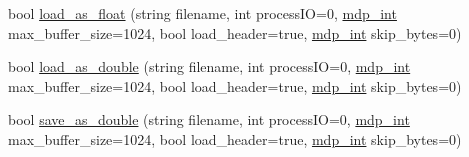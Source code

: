 \begin{DoxyCompactItemize}
\item 
bool \hyperlink{classmdp__complex__field_a41ca79e9686143c660588426dc71dd0b}{load\+\_\+as\+\_\+float} (string filename, int process\+IO=0, \hyperlink{mdp__global__vars_8h_aaa1ad9d0dcd2124aa5af0120d9954174}{mdp\+\_\+int} max\+\_\+buffer\+\_\+size=1024, bool load\+\_\+header=true, \hyperlink{mdp__global__vars_8h_aaa1ad9d0dcd2124aa5af0120d9954174}{mdp\+\_\+int} skip\+\_\+bytes=0)
\item 
bool \hyperlink{classmdp__complex__field_ae7c4fe41d81ce71b9d1527b15916391f}{load\+\_\+as\+\_\+double} (string filename, int process\+IO=0, \hyperlink{mdp__global__vars_8h_aaa1ad9d0dcd2124aa5af0120d9954174}{mdp\+\_\+int} max\+\_\+buffer\+\_\+size=1024, bool load\+\_\+header=true, \hyperlink{mdp__global__vars_8h_aaa1ad9d0dcd2124aa5af0120d9954174}{mdp\+\_\+int} skip\+\_\+bytes=0)
\item 
bool \hyperlink{classmdp__complex__field_aa6357291a82fe4209f7b3a7ecce3ca78}{save\+\_\+as\+\_\+double} (string filename, int process\+IO=0, \hyperlink{mdp__global__vars_8h_aaa1ad9d0dcd2124aa5af0120d9954174}{mdp\+\_\+int} max\+\_\+buffer\+\_\+size=1024, bool load\+\_\+header=true, \hyperlink{mdp__global__vars_8h_aaa1ad9d0dcd2124aa5af0120d9954174}{mdp\+\_\+int} skip\+\_\+bytes=0)
\end{DoxyCompactItemize}
